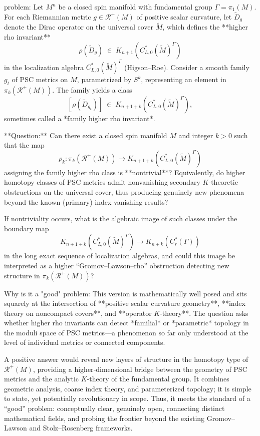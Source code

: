 problem:  
Let \( M^n \) be a closed spin manifold with fundamental group \( \Gamma = \pi_1(M) \). For each Riemannian metric \( g \in \mathcal{R}^+(M) \) of positive scalar curvature, let \( \widetilde{D}_g \) denote the Dirac operator on the universal cover \(\widetilde{M}\), which defines the **higher rho invariant**
\[
\rho(\widetilde{D}_g) \;\in\; K_{n+1}(C^*_{L,0}(\widetilde{M})^\Gamma)
\]
in the localization algebra \( C^*_{L,0}(\widetilde{M})^\Gamma \) (Higson–Roe).  
Consider a smooth family \( g_t \) of PSC metrics on \(M\), parametrized by \( S^k \), representing an element in \( \pi_k(\mathcal{R}^+(M)) \). The family yields a class
\[
[\rho(\widetilde{D}_{g_t})] \;\in\; K_{n+1+k}(C^*_{L,0}(\widetilde{M})^\Gamma),
\]
sometimes called a *family higher rho invariant*.  

**Question:**  
Can there exist a closed spin manifold \(M\) and integer \(k>0\) such that the map
\[
\rho_k : \pi_k(\mathcal{R}^+(M)) \longrightarrow K_{n+1+k}(C^*_{L,0}(\widetilde{M})^\Gamma)
\]
assigning the family higher rho class is **nontrivial**? Equivalently, do higher homotopy classes of PSC metrics admit nonvanishing secondary \(K\)-theoretic obstructions on the universal cover, thus producing genuinely new phenomena beyond the known (primary) index vanishing results?  

If nontriviality occurs, what is the algebraic image of such classes under the boundary map  
\[
K_{n+1+k}(C^*_{L,0}(\widetilde{M})^\Gamma) \longrightarrow K_{n+k}(C^*_r(\Gamma))
\]
in the long exact sequence of localization algebras, and could this image be interpreted as a higher “Gromov–Lawson–rho” obstruction detecting new structure in \(\pi_k(\mathcal{R}^+(M))\)?  

Why is it a "good" problem:  
This version is mathematically well posed and sits squarely at the intersection of **positive scalar curvature geometry**, **index theory on noncompact covers**, and **operator \(K\)-theory**. The question asks whether higher rho invariants can detect *familial* or *parametric* topology in the moduli space of PSC metrics—a phenomenon so far only understood at the level of individual metrics or connected components.  

A positive answer would reveal new layers of structure in the homotopy type of \( \mathcal{R}^+(M) \), providing a higher‑dimensional bridge between the geometry of PSC metrics and the analytic \(K\)-theory of the fundamental group. It combines geometric analysis, coarse index theory, and parameterized topology; it is simple to state, yet potentially revolutionary in scope.  
Thus, it meets the standard of a “good” problem: conceptually clear, genuinely open, connecting distinct mathematical fields, and probing the frontier beyond the existing Gromov–Lawson and Stolz–Rosenberg frameworks.